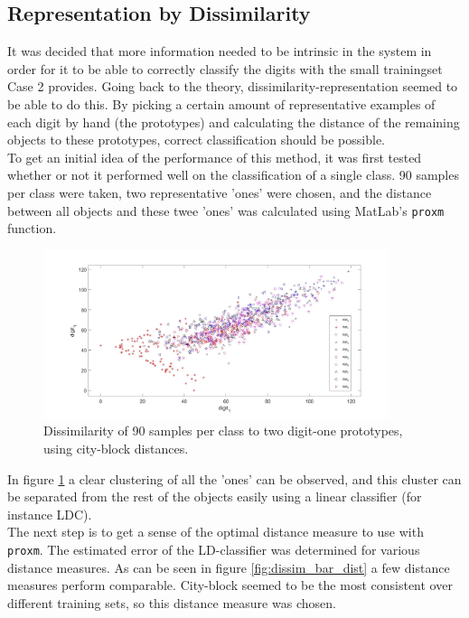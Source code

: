\subsection{Representation by Dissimilarity}
It was decided that more information needed to be intrinsic in the system in order for it to be able to correctly classify the digits with the small trainingset Case 2 provides. Going back to the theory, dissimilarity-representation seemed to be able to do this. By picking a certain amount of representative examples of each digit by hand (the prototypes) and calculating the distance of the remaining objects to these prototypes, correct classification should be possible. \\
\noindent To get an initial idea of the performance of this method, it was first tested whether or not it performed well on the classification of a single class. 90 samples per class were taken, two representative 'ones' were chosen, and the distance between all objects and these twee 'ones' was calculated using MatLab's \texttt{proxm} function. 
\begin{figure}[H]
	\centering
	\includegraphics[width = 0.9\textwidth]{images/dissim_two_ones.jpg}
	\caption{Dissimilarity of 90 samples per class to two digit-one prototypes, using city-block distances.}
	\label{fig:dissim_two_ones}
\end{figure}
\noindent In figure \ref{fig:dissim_two_ones} a clear clustering of all the 'ones' can be observed, and this cluster can be separated from the rest of the objects easily using a linear classifier (for instance LDC).\\
The next step is to get a sense of the optimal distance measure to use with \texttt{proxm}. The estimated error of the LD-classifier was determined for various distance measures. As can be seen in figure \ref{fig:dissim_bar_dist} a few distance measures perform comparable. City-block seemed to be the most consistent over different training sets, so this distance measure was chosen.  \\
